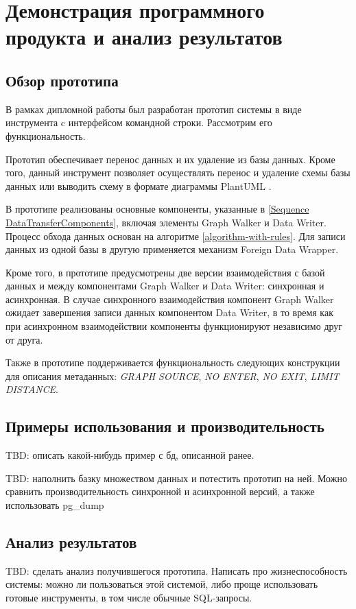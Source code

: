 \section{Демонстрация программного продукта и анализ результатов}

\subsection{Обзор прототипа}
В рамках дипломной работы был разработан прототип системы в виде инструмента c интерфейсом командной строки. Рассмотрим его функциональность.

Прототип обеспечивает перенос данных и их удаление из базы данных. Кроме того, данный инструмент позволяет осуществлять перенос и удаление схемы базы данных или выводить схему в формате диаграммы PlantUML \cite{plantuml}.

В прототипе реализованы основные компоненты, указанные в \ref{Sequence DataTransferComponents}, включая элементы Graph Walker и Data Writer. Процесс обхода данных основан на алгоритме \ref{algorithm-with-rules}. Для записи данных из одной базы в другую применяется механизм Foreign Data Wrapper.

Кроме того, в прототипе предусмотрены две версии взаимодействия с базой данных и между компонентами Graph Walker и Data Writer: синхронная и асинхронная. В случае синхронного взаимодействия компонент Graph Walker ожидает завершения записи данных компонентом Data Writer, в то время как при асинхронном взаимодействии компоненты функционируют независимо друг от друга.

Также в прототипе поддерживается функциональность следующих конструкции для описания метаданных: \textit{GRAPH SOURCE}, \textit{NO ENTER}, \textit{NO EXIT}, \textit{LIMIT DISTANCE}.

\subsection{Примеры использования и производительность}

TBD: описать какой-нибудь пример с бд, описанной ранее.

TBD: наполнить базку множеством данных и потестить прототип на ней. Можно сравнить производительность синхронной и асинхронной версий, а также использовать pg\_dump

\subsection{Анализ результатов}

TBD: сделать анализ получившегося прототипа. Написать про жизнеспособность системы: можно ли пользоваться этой системой, либо проще использовать готовые инструменты, в том числе обычные SQL-запросы.
